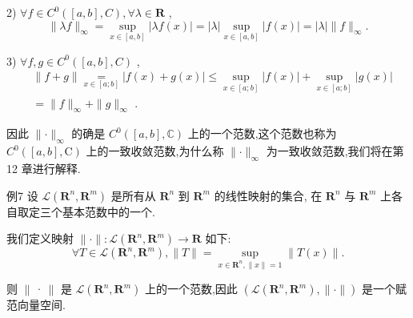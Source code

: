 2) $\forall f \in  {C}^{0}\left( {\left\lbrack  {a,b}\right\rbrack  ,C}\right) ,\forall \lambda  \in  \mathbf{R}$ ,
$$\parallel {\lambda f}{\parallel }_{\infty } = \mathop{\sup }\limits_{{x \in  \left\lbrack  {a,b}\right\rbrack  }}\left| {{\lambda f}\left( x\right) }\right|  = \left| \lambda \right| \mathop{\sup }\limits_{{x \in  \left\lbrack  {a,b}\right\rbrack  }}\left| {f\left( x\right) }\right|  = \left| \lambda \right| \parallel f{\parallel }_{\infty }.$$

3) $\forall f,g \in  {C}^{0}\left( {\left\lbrack  {a,b}\right\rbrack  ,C}\right)$ ,
\begin{align*}
	&\parallel f + g\parallel \underset{x \in  \left\lbrack  {a;b}\right\rbrack  }{ = }\left| {f\left( x\right)  + g\left( x\right) }\right|  \leq  \mathop{\sup }\limits_{{x \in  \left\lbrack  {a;b}\right\rbrack  }}\left| {f\left( x\right) }\right|  + \mathop{\sup }\limits_{{x \in  \left\lbrack  {a;b}\right\rbrack  }}\left| {g\left( x\right) }\right|\\
	&= \parallel f{\parallel }_{\infty } + \parallel g{\parallel }_{\infty }\text{ . }
\end{align*}

因此 $\parallel  \cdot  {\parallel }_{\infty }$ 的确是 ${C}^{0}\left( {\left\lbrack  {a,b}\right\rbrack  ,\mathbb{C}}\right)$ 上的一个范数,这个范数也称为 ${C}^{0}\left( {\left\lbrack  {a,b}\right\rbrack  ,\mathrm{C}}\right)$ 上的一致收敛范数,为什么称 $\parallel  \cdot  {\parallel }_{\infty }$ 为一致收敛范数,我们将在第 12 章进行解释.

例7 设 $\mathcal{L}\left( {{\mathbf{R}}^{n},{\mathbf{R}}^{m}}\right)$ 是所有从 ${\mathbf{R}}^{n}$ 到 ${\mathbf{R}}^{m}$ 的线性映射的集合, 在 ${\mathbf{R}}^{n}$ 与 ${\mathbf{R}}^{m}$ 上各自取定三个基本范数中的一个.

我们定义映射 $\parallel  \cdot  \parallel  : \mathcal{L}\left( {{\mathbf{R}}^{n},{\mathbf{R}}^{m}}\right)  \rightarrow  \mathbf{R}$ 如下:
$$\forall T \in  \mathcal{L}\left( {{\mathbf{R}}^{n},{\mathbf{R}}^{m}}\right) ,\parallel T\parallel  = \mathop{\sup }\limits_{{x \in  {\mathbf{R}}^{n},\parallel x\parallel  = 1}}\parallel T\left( x\right) \parallel .$$

则 $\begin{Vmatrix}\cdot \end{Vmatrix}$ 是 $\mathcal{L}\left( {{\mathbf{R}}^{n},{\mathbf{R}}^{m}}\right)$ 上的一个范数,因此 $\left( {\mathcal{L}\left( {{\mathbf{R}}^{n},{\mathbf{R}}^{m}}\right) ,\parallel  \cdot  \parallel }\right)$ 是一个赋范向量空间.

